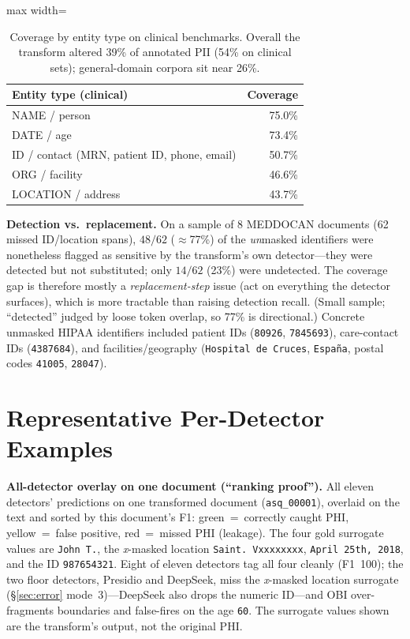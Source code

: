 \documentclass[pmlr,twocolumn,10pt]{jmlr}
\newcommand{\hg}[1]{\colorbox{hgreen}{#1}}
\newcommand{\hy}[1]{\colorbox{hyellow}{#1}}
\newcommand{\hr}[1]{\colorbox{hred}{#1}}
\newcommand{\tp}[1]{\texttt{#1}}
\begin{document}
\begin{table}[h]\centering\small
\begin{adjustbox}{max width=\columnwidth}%
\begin{tabular}{lr}
\toprule
Entity type (clinical) & Coverage\\
\midrule
NAME / person & 75.0\%\\
DATE / age & 73.4\%\\
ID / contact (MRN, patient ID, phone, email) & 50.7\%\\
ORG / facility & 46.6\%\\
LOCATION / address & 43.7\%\\
\bottomrule
\end{tabular}
\end{adjustbox}
\caption{Coverage by entity type on clinical benchmarks. Overall the transform altered 39\% of annotated PII (54\% on clinical sets); general-domain corpora sit near 26\%.}\label{tab:covtype}
\end{table}

\textbf{Detection vs.\ replacement.} On a sample of 8 MEDDOCAN documents (62 missed ID/location spans), $48/62$ ($\approx$77\%) of the \emph{un}masked identifiers were nonetheless flagged as sensitive by the transform's own detector---they were detected but not substituted; only $14/62$ (23\%) were undetected. The coverage gap is therefore mostly a \emph{replacement-step} issue (act on everything the detector surfaces), which is more tractable than raising detection recall. (Small sample; ``detected'' judged by loose token overlap, so 77\% is directional.) Concrete unmasked HIPAA identifiers included patient IDs (\tp{80926}, \tp{7845693}), care-contact IDs (\tp{4387684}), and facilities/geography (\tp{Hospital de Cruces}, \tp{Espa\~na}, postal codes \tp{41005}, \tp{28047}).

\section{Representative Per-Detector Examples}\label{app:examples}

\textbf{All-detector overlay on one document (``ranking proof'').} All eleven detectors' predictions on one transformed document (\tp{asq\_00001}), overlaid on the text and sorted by this document's F1: \hg{green}~=~correctly caught PHI, \hy{yellow}~=~false positive, \hr{red}~=~missed PHI (leakage). The four gold surrogate values are \tp{John T.}, the \emph{x}-masked location \tp{Saint. Vxxxxxxxx}, \tp{April 25th, 2018}, and the ID \tp{987654321}. Eight of eleven detectors tag all four cleanly (F1~100); the two floor detectors, Presidio and DeepSeek, miss the \emph{x}-masked location surrogate (§\ref{sec:error} mode~3)---DeepSeek also drops the numeric ID---and OBI over-fragments boundaries and false-fires on the age \tp{60}. The surrogate values shown are the transform's output, not the original PHI.
\end{document}
